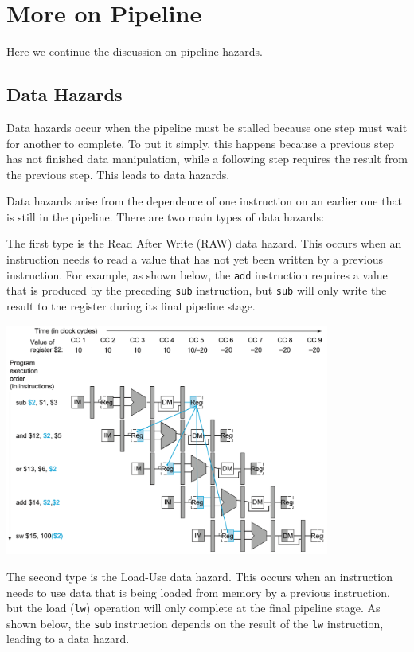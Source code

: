 \chapter{More on Pipeline}

Here we continue the discussion on pipeline hazards. 

\section{Data Hazards}
Data hazards occur when the pipeline must be stalled because one step must wait for another to complete. To put it simply, this happens because a previous step has not finished data manipulation, while a following step requires the result from the previous step. This leads to data hazards.

Data hazards arise from the dependence of one instruction on an earlier one that is still in the pipeline. There are two main types of data hazards:

The first type is the Read After Write (RAW) data hazard. This occurs when an instruction needs to read a value that has not yet been written by a previous instruction. For example, as shown below, the \verb|add| instruction requires a value that is produced by the preceding \verb|sub| instruction, but \verb|sub| will only write the result to the register during its final pipeline stage.

\begin{center}
  \includegraphics[width=0.8\textwidth]{Figure/pipeline_raw.png}
\end{center}

The second type is the Load-Use data hazard. This occurs when an instruction needs to use data that is being loaded from memory by a previous instruction, but the load (\verb|lw|) operation will only complete at the final pipeline stage. As shown below, the \verb|sub| instruction depends on the result of the \verb|lw| instruction, leading to a data hazard.

